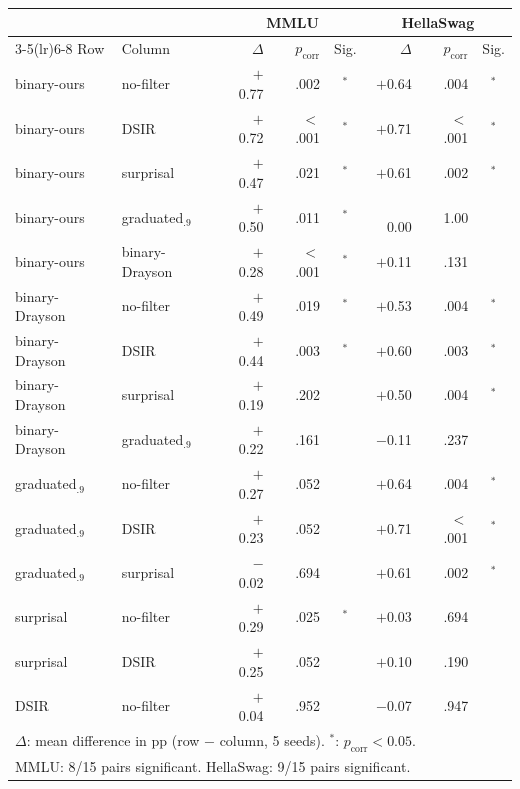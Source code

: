 \begin{tabular}{llrrcrrc}
\toprule
& & \multicolumn{3}{c}{MMLU} & \multicolumn{3}{c}{HellaSwag} \\
\cmidrule(lr){3-5}\cmidrule(lr){6-8}
Row & Column & $\Delta$ & $p_{\text{corr}}$ & Sig. & $\Delta$ & $p_{\text{corr}}$ & Sig. \\
\midrule
binary-ours & no-filter      & $+$0.77 & .002  & $^*$ & $+$0.64 & .004 & $^*$ \\
binary-ours & DSIR           & $+$0.72 & $<$.001 & $^*$ & $+$0.71 & $<$.001 & $^*$ \\
binary-ours & surprisal      & $+$0.47 & .021  & $^*$ & $+$0.61 & .002 & $^*$ \\
binary-ours & graduated$_{.9}$ & $+$0.50 & .011  & $^*$ & $\phantom{+}$0.00 & 1.00 & \\
binary-ours & binary-Drayson & $+$0.28 & $<$.001 & $^*$ & $+$0.11 & .131 & \\
\midrule
binary-Drayson & no-filter      & $+$0.49 & .019 & $^*$ & $+$0.53 & .004 & $^*$ \\
binary-Drayson & DSIR           & $+$0.44 & .003 & $^*$ & $+$0.60 & .003 & $^*$ \\
binary-Drayson & surprisal      & $+$0.19 & .202 &      & $+$0.50 & .004 & $^*$ \\
binary-Drayson & graduated$_{.9}$ & $+$0.22 & .161 &    & $-$0.11 & .237 & \\
\midrule
graduated$_{.9}$ & no-filter   & $+$0.27 & .052  &      & $+$0.64 & .004 & $^*$ \\
graduated$_{.9}$ & DSIR        & $+$0.23 & .052  &      & $+$0.71 & $<$.001 & $^*$ \\
graduated$_{.9}$ & surprisal   & $-$0.02 & .694  &      & $+$0.61 & .002 & $^*$ \\
\midrule
surprisal   & no-filter      & $+$0.29 & .025  & $^*$ & $+$0.03 & .694 & \\
surprisal   & DSIR           & $+$0.25 & .052  &      & $+$0.10 & .190 & \\
\midrule
DSIR        & no-filter      & $+$0.04 & .952  &      & $-$0.07 & .947 & \\
\bottomrule
\multicolumn{8}{l}{\footnotesize $\Delta$: mean difference in pp (row $-$ column, 5 seeds). $^*$: $p_{\text{corr}} < 0.05$.} \\
\multicolumn{8}{l}{\footnotesize MMLU: 8/15 pairs significant. HellaSwag: 9/15 pairs significant.}
\end{tabular}

